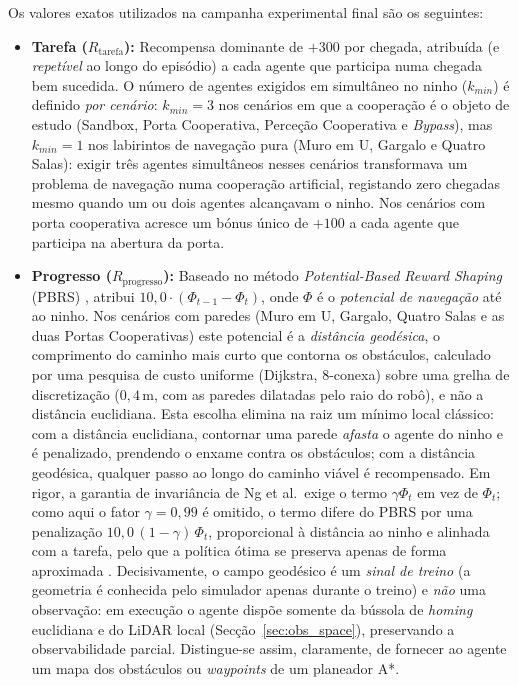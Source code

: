 \documentclass[12pt,reqno, twoside]{amsbook}
\theoremstyle{plain}
\numberwithin{equation}{chapter}
\numberwithin{section}{chapter}
\numberwithin{table}{chapter}
\numberwithin{figure}{chapter}
\begin{document}
Os valores exatos utilizados na campanha experimental final são os seguintes:
\begin{itemize}
    \item \textbf{Tarefa ($R_{\text{tarefa}}$):} Recompensa dominante de $+300$ por chegada, atribuída (e \emph{repetível} ao longo do episódio) a cada agente que participa numa chegada bem sucedida. O número de agentes exigidos em simultâneo no ninho ($k_{min}$) é definido \emph{por cenário}: $k_{min}=3$ nos cenários em que a cooperação é o objeto de estudo (Sandbox, Porta Cooperativa, Perceção Cooperativa e \textit{Bypass}), mas $k_{min}=1$ nos labirintos de navegação pura (Muro em U, Gargalo e Quatro Salas): exigir três agentes simultâneos nesses cenários transformava um problema de navegação numa cooperação artificial, registando zero chegadas mesmo quando um ou dois agentes alcançavam o ninho. Nos cenários com porta cooperativa acresce um bónus único de $+100$ a cada agente que participa na abertura da porta.
    \item \textbf{Progresso ($R_{\text{progresso}}$):} Baseado no método \textit{Potential-Based Reward Shaping} (PBRS) \cite{ng1999policy}, atribui $10{,}0 \cdot (\Phi_{t-1} - \Phi_{t})$, onde $\Phi$ é o \emph{potencial de navegação} até ao ninho. Nos cenários com paredes (Muro em U, Gargalo, Quatro Salas e as duas Portas Cooperativas) este potencial é a \emph{distância geodésica}, o comprimento do caminho mais curto que contorna os obstáculos, calculado por uma pesquisa de custo uniforme (Dijkstra, 8-conexa) sobre uma grelha de discretização ($0{,}4$\,m, com as paredes dilatadas pelo raio do robô), e não a distância euclidiana. Esta escolha elimina na raiz um mínimo local clássico: com a distância euclidiana, contornar uma parede \textit{afasta} o agente do ninho e é penalizado, prendendo o enxame contra os obstáculos; com a distância geodésica, qualquer passo ao longo do caminho viável é recompensado. Em rigor, a garantia de invariância de Ng et al.\ exige o termo $\gamma\Phi_{t}$ em vez de $\Phi_{t}$; como aqui o fator $\gamma=0{,}99$ é omitido, o termo difere do PBRS por uma penalização $10{,}0\,(1-\gamma)\,\Phi_{t}$, proporcional à distância ao ninho e alinhada com a tarefa, pelo que a política ótima se preserva apenas de forma aproximada \cite{ng1999policy}. Decisivamente, o campo geodésico é um \emph{sinal de treino} (a geometria é conhecida pelo simulador apenas durante o treino) e \emph{não} uma observação: em execução o agente dispõe somente da bússola de \textit{homing} euclidiana e do LiDAR local (Secção~\ref{sec:obs_space}), preservando a observabilidade parcial. Distingue-se assim, claramente, de fornecer ao agente um mapa dos obstáculos ou \textit{waypoints} de um planeador A*.

\end{itemize}
\end{document}
